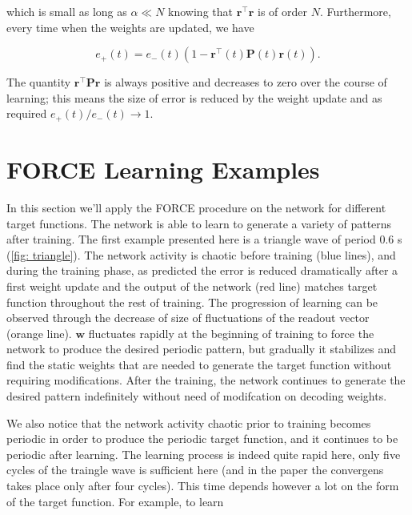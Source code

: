 \noindent
which is small as long as $\alpha \ll N$ knowing that 
$\mathbf{r}^{\top}\mathbf{r}$ is of order $N$. Furthermore, every time
when the weights are updated, we have

\[e_+(t) = e_-(t)(1-\mathbf{r}^{\top}(t)\mathbf{P}(t)\mathbf{r}(t)).\]

\noindent
The quantity $\mathbf{r}^{\top}\mathbf{Pr}$ is always positive and
decreases to zero over the course of learning; this means the size of 
error is reduced by the weight update and as required 
$e_+(t)/e_-(t) \rightarrow 1$.


\section{FORCE Learning Examples}

In this section we'll apply the FORCE procedure on the network for different
target functions. The network is able to learn to generate a variety of
patterns after training. The first example presented here is a 
triangle wave of period 0.6 s (\autoref{fig: triangle}). 
The network activity is chaotic before training (blue lines), and 
during the training
phase, as predicted the error is reduced dramatically after a first weight
update and the output of the network (red line)
matches target function throughout
the rest of training. The progression of learning can be observed through
the decrease of size of fluctuations of the readout vector
(orange line). $\mathbf{w}$ 
fluctuates rapidly at the beginning of training to force the network
to produce the desired periodic pattern, but gradually it stabilizes and
find the static weights that are needed to generate the target function
without requiring modifications. After the training, the network continues
to generate the desired pattern indefinitely without need of modifcation 
on decoding weights.

We also notice that the network activity chaotic prior to training 
becomes periodic in order to produce the periodic target function, and
it continues to be periodic after learning. The learning process is indeed
quite rapid here, only five cycles of the traingle wave is sufficient 
here (and in the paper the convergens takes place only after four cycles).
This time depends however a lot on the form of the target function.
For example, to learn


